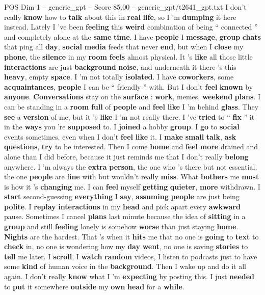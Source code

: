 \begin{textsample}{POS Dim 1 – generic\_gpt – Score 85.00 – generic\_gpt/t2641\_gpt.txt}  \label{ex:f1_pos_002}
I don't really \textbf{know} how to \textbf{talk} about this in \textbf{real} \textbf{life}, so I ’m \textbf{dumping} it here instead.
Lately I ’ve been \textbf{feeling} this \textbf{weird} combination of being “ connected ” and completely alone at the \textbf{same} \textbf{time}.
I have \textbf{people} I \textbf{message}, \textbf{group} \textbf{chats} that ping all \textbf{day}, \textbf{social} \textbf{media} feeds that never \textbf{end}, but when I \textbf{close} my \textbf{phone}, the \textbf{silence} in my \textbf{room} \textbf{feels} almost physical.
It ’s \textbf{like} all those little \textbf{interactions} are just \textbf{background} \textbf{noise}, and underneath it there ’s this \textbf{heavy}, empty \textbf{space}.
I ’m not totally \textbf{isolated}.
I have \textbf{coworkers}, some \textbf{acquaintances}, \textbf{people} I can be “ friendly ” with.
But I don't \textbf{feel} \textbf{known} by \textbf{anyone}. \textbf{Conversations} stay on the \textbf{surface} : \textbf{work}, memes, \textbf{weekend} \textbf{plans}.
I can be standing in a \textbf{room} \textbf{full} of \textbf{people} and \textbf{feel} \textbf{like} I ’m behind \textbf{glass}.
They \textbf{see} a \textbf{version} of me, but it ’s \textbf{like} I ’m not really there.
I ’ve \textbf{tried} to “ \textbf{fix} ” it in the \textbf{ways} you ’re \textbf{supposed} to.
I \textbf{joined} a hobby \textbf{group}.
I \textbf{go} to \textbf{social} events sometimes, even when I don't \textbf{feel} \textbf{like} it.
I \textbf{make} \textbf{small} \textbf{talk}, \textbf{ask} \textbf{questions}, \textbf{try} to be interested.
Then I come \textbf{home} and \textbf{feel} \textbf{more} drained and alone than I did before, because it just reminds me that I don't really \textbf{belong} anywhere.
I ’m always the \textbf{extra} \textbf{person}, the one who ’s there but not essential, the one \textbf{people} are \textbf{fine} with but wouldn't really \textbf{miss}.
What \textbf{bothers} me \textbf{most} is how it ’s \textbf{changing} me.
I can \textbf{feel} myself \textbf{getting} \textbf{quieter}, \textbf{more} withdrawn.
I \textbf{start} second-guessing \textbf{everything} I \textbf{say}, \textbf{assuming} \textbf{people} are just being \textbf{polite}.
I \textbf{replay} \textbf{interactions} in my \textbf{head} and pick apart every \textbf{awkward} pause.
Sometimes I cancel \textbf{plans} last minute because the idea of \textbf{sitting} in a \textbf{group} and still \textbf{feeling} lonely is somehow \textbf{worse} than just staying \textbf{home}. \textbf{Nights} are the hardest.
That ’s when it \textbf{hits} me that no one is \textbf{going} to \textbf{text} to \textbf{check} in, no one is wondering how my \textbf{day} \textbf{went}, no one is saving \textbf{stories} to \textbf{tell} me later.
I \textbf{scroll}, I \textbf{watch} \textbf{random} videos, I listen to podcasts just to have some \textbf{kind} of human voice in the \textbf{background}.
Then I wake up and do it all again.
I don't really \textbf{know} what I ’m \textbf{expecting} by posting this.
I just \textbf{needed} to \textbf{put} it somewhere \textbf{outside} my \textbf{own} \textbf{head} for a \textbf{while}.


\end{textsample}
